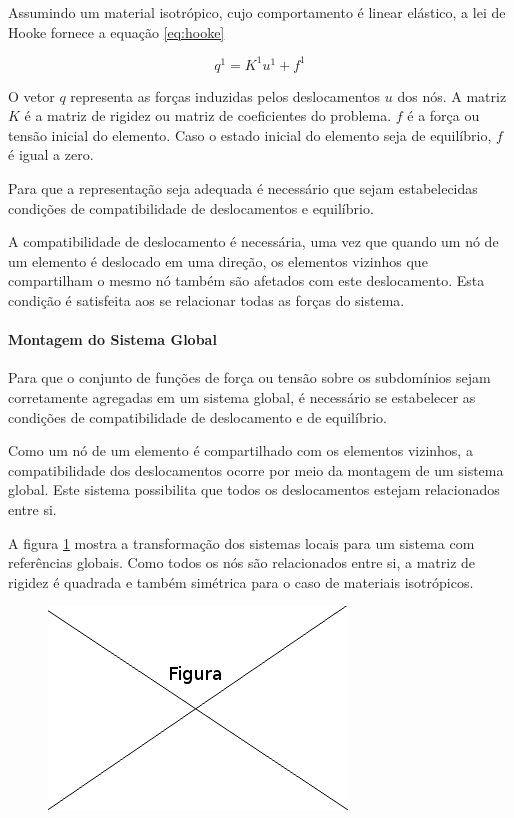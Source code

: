 Assumindo um material isotrópico, cujo comportamento é linear elástico, a lei de Hooke fornece a equação \ref{eq:hooke}

 \begin{equation}
 	\label{eq:hooke}
	\textbf{$q^1 = K^1 u^1 + f^1$}
 \end{equation}
 
 O vetor $q$ representa as forças induzidas pelos deslocamentos $u$ dos nós. A matriz $K$ é a matriz de rigidez ou matriz de coeficientes do problema. $f$ é a força ou tensão inicial do elemento. Caso o estado inicial do elemento seja de equilíbrio, $f$ é igual a zero.
 
 Para que a representação seja adequada é necessário que sejam estabelecidas condições de compatibilidade de deslocamentos e equilíbrio.
 
 A compatibilidade de deslocamento é necessária, uma vez que quando um nó de um elemento é deslocado em uma direção, os elementos vizinhos que compartilham o mesmo nó também são afetados com este deslocamento. Esta condição é satisfeita aos se relacionar todas as forças do sistema.
 
 \paragraph{Montagem do Sistema Global}
 
 Para que o conjunto de funções de força ou tensão sobre os subdomínios sejam corretamente agregadas em um sistema global, é necessário se estabelecer as condições de compatibilidade de deslocamento e de equilíbrio.
 
 Como um nó de um elemento é compartilhado com os elementos vizinhos, a compatibilidade dos deslocamentos ocorre por meio da montagem de um sistema global. Este sistema possibilita que todos os deslocamentos estejam relacionados entre si.
 
  A figura \ref{fig:loc2glob} mostra a transformação dos sistemas locais para um sistema com referências globais. Como todos os nós são relacionados entre si, a matriz de rigidez é quadrada e também simétrica para o caso de materiais isotrópicos.
  
  \begin{figure}[!htb]
  \centering
  \includegraphics[scale=0.5]{figuras/temp.png}
  \caption{}
  \label{fig:loc2glob}
  \end{figure}
  
